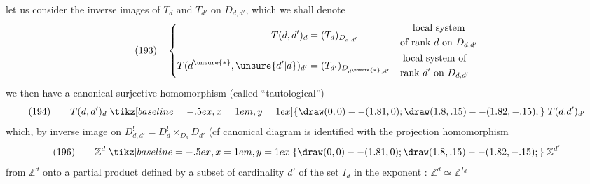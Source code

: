 let us consider the inverse images of $T_d$ and $T_{d'}$ on $D_{d,d'}$, which we shall denote
\[
(193)\quad\left\{\begin{aligned}
T(d,d')_d&=(T_d)_{D_{d,d'}}&&\begin{gathered}\text{local system}\\\text{of rank }d\text{ on }D_{d,d'}\end{gathered}\\
T(d^{\unsure{*}},\unsure{d'|d})_{d'}&=(T_{d'})_{D_{d^{\unsure{*}},d'}}&&\begin{gathered}\text{local system of}\\\text{rank }d'\text{ on }D_{d,d'}\end{gathered}
\end{aligned}\right.
\]
we then have a canonical surjective homomorphism (called ``tautological'')
\[
(194)\qquad T(d,d')_d\mathrel{\tikz[baseline=-.5ex,x=1em,y=1ex]{\draw (0,0)--(1.81,0);\draw (1.8,.15)--(1.82,-.15);}}T(d.d')_{d'}
\]
which, by inverse image on $D^!_{d,d'}=D^!_d\mathbin\times_{D_d}D_{d'}$ (cf canonical diagram
is identified with the projection homomorphism
\[
(196)\qquad\mathbb Z^d\mathrel{\tikz[baseline=-.5ex,x=1em,y=1ex]{\draw (0,0)--(1.81,0);\draw (1.8,.15)--(1.82,-.15);}}\mathbb Z^{d'}
\]
from $\mathbb Z^d$ onto a partial product defined by a subset of cardinality $d'$ of the set $I_d$ in the exponent : $\mathbb Z^d\simeq\mathbb Z^{I_d}$
